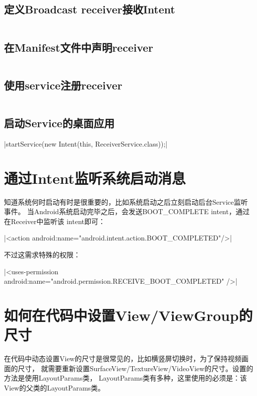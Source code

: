 ﻿\documentclass[a4paper,11pt]{article}
\begin{document}
  \subsection[定义Broadcast receiver接收Intent]{定义Broadcast receiver接收Intent}
  \inputminted[linenos,tabsize=4,bgcolor=srcbg,fontsize=\small]{java}{ScreenBroadcastReceiver.java}

  \subsection[在Manifest文件中声明receiver]{在Manifest文件中声明receiver}
  \inputminted[linenos,tabsize=4,bgcolor=srcbg]{xml}{AndroidManifest.xml}

  \subsection[使用service注册receiver]{使用service注册receiver}
  \inputminted[linenos,tabsize=4,bgcolor=srcbg]{java}{ReceiverService.java}

  \subsection[启动Service的桌面应用]{启动Service的桌面应用}
  |startService(new Intent(this, ReceiverService.class));|
  
  \section[通过Intent监听系统启动消息]{通过Intent监听系统启动消息}
  知道系统何时启动有时是很重要的，比如系统启动之后立刻启动后台Service监听事件。
  当Android系统启动完毕之后，会发送BOOT\_COMPLETE intent，通过在Receiver中监听该
  intent即可：\par
  |<action android:name="android.intent.action.BOOT_COMPLETED"/>|
  
  不过这需求特殊的权限：\par
  |<uses-permission android:name="android.permission.RECEIVE_BOOT_COMPLETED" />|


  \section[如何在代码中设置View/ViewGroup的尺寸]{如何在代码中设置View/ViewGroup的尺寸}
  在代码中动态设置View的尺寸是很常见的，比如横竖屏切换时，为了保持视频画面的尺寸，
  就需要重新设置SurfaceView/TextureView/VideoView的尺寸。设置的方法是使用LayoutParams类，
  LayoutParams类有多种，这里使用的必须是：该View的父类的LayoutParams类。
\end{document}
